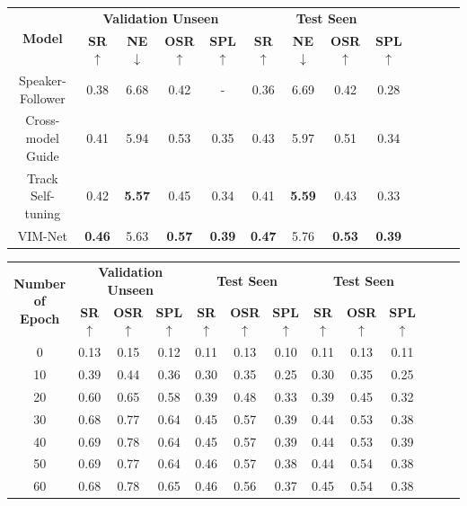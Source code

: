 \begin{table}[h]
	\centering
	
	{\begin{tabular}[c]{ccccccccccccc}
			\toprule[1pt]
			\multirow{2}{*}{{\textbf{Model}}} & \multicolumn{4}{c}{{\textbf{Validation Unseen}}} & \multicolumn{4}{c}{{\textbf{Test Seen}}}\\
			
			& \textbf{SR}$\uparrow$ & \textbf{NE}$\downarrow$ & \textbf{OSR}$\uparrow$ & \textbf{SPL}$\uparrow$	& \textbf{SR}$\uparrow$ & \textbf{NE}$\downarrow$ & \textbf{OSR}$\uparrow$ & \textbf{SPL}$\uparrow$ & \\
			\toprule[1pt]
			
			Speaker-Follower   & 0.38 & 6.68 & 0.42 & - & 0.36 & 6.69 & 0.42 & 0.28\\
			\toprule[1pt]
			Cross-model Guide  & 0.41 & 5.94 & 0.53  & 0.35 & 0.43 &  5.97 &  0.51 & 0.34\\
			Track Self-tuning   & 0.42 & \textbf{5.57} & 0.45 & 0.34  & 0.41 & \textbf{5.59} & 0.43 & 0.33\\
			VIM-Net & \textbf{0.46} & 5.63 & \textbf{0.57} & \textbf{0.39} & \textbf{0.47} &  5.76 & \textbf{0.53} & \textbf{0.39}\\
			
			\bottomrule[1pt]
		\end{tabular}
		\label{table_2}}
\end{table}

\begin{table}[h]
	\centering
	{\begin{tabular}[c]{ccccccccccccc}
			\toprule[1pt]
			\multirow{2}{*}{{\textbf{Number of Epoch}}} & \multicolumn{3}{c}{{\textbf{Validation Unseen}}} & \multicolumn{3}{c}{{\textbf{Test Seen}}} & \multicolumn{3}{c}{{\textbf{Test Seen}}}\\
			
			& \textbf{SR}$\uparrow$ & \textbf{OSR}$\uparrow$ & \textbf{SPL}$\uparrow$	& \textbf{SR}$\uparrow$ & \textbf{OSR}$\uparrow$ & \textbf{SPL}$\uparrow$ & \textbf{SR}$\uparrow$ & \textbf{OSR}$\uparrow$ & \textbf{SPL}$\uparrow$ \\
			\toprule[1pt]
			0	& 0.13 & 0.15 & 0.12 & 0.11 & 0.13 & 0.10 & 0.11 & 0.13 & 0.11\\
			10   & 0.39 & 0.44 & 0.36 & 0.30 & 0.35 & 0.25  & 0.30 & 0.35 & 0.25\\
			20  & 0.60 & 0.65 & 0.58  & 0.39 & 0.48 &  0.33 & 0.39 & 0.45 &  0.32\\
			30   & 0.68 & 0.77 & 0.64 & 0.45 & 0.57 & 0.39 & 0.44 & 0.53 & 0.38 \\
			40 	& 0.69 & 0.78 & 0.64 & 0.45 & 0.57 & 0.39 & 0.44 & 0.53 & 0.39\\
			50	& 0.69 & 0.77 & 0.64 & 0.46 & 0.57 & 0.38 & 0.44 & 0.54 & 0.38\\
			60	& 0.68 & 0.78 & 0.65 & 0.46 & 0.56 & 0.37 & 0.45 & 0.54 & 0.38 \\

			\bottomrule[1pt]
		\end{tabular}
		\label{table_3}}
\end{table}


